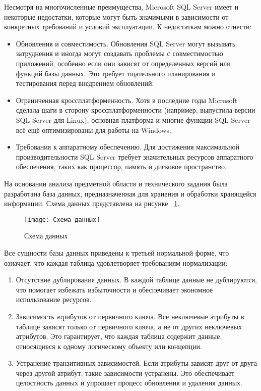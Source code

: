 Несмотря на многочисленные преимущества, Microsoft SQL Server имеет и некоторые недостатки, которые могут быть значимыми в зависимости от конкретных требований и условий эксплуатации. К недостаткам можно отнести:
\begin{itemize}
	\item Обновления и совместимость. Обновления SQL Server могут вызывать затруднения и иногда могут создавать проблемы с совместимостью приложений, особенно если они зависят от определенных версий или функций базы данных. Это требует тщательного планирования и тестирования перед внедрением обновлений.
	\item Ограниченная кроссплатформенность. Хотя в последние годы Microsoft сделала шаги в сторону кроссплатформенности (например, выпустила версии SQL Server для Linux), основная платформа и многие функции SQL Server всё ещё оптимизированы для работы на Windows. 
	\item Требования к аппаратному обеспечению. Для достижения максимальной производительности SQL Server требует значительных ресурсов аппаратного обеспечения, таких как процессор, память и дисковое пространство.
\end{itemize}

На основании анализа предметной области и технического задания была разработана база данных, предназначенная для хранения и обработки хранящейся информации. Схема данных представлена на рисунке ~\ref{templ:image1}.
\begin{figure}[H]
	\texttt{[image: Схема данных]}
	\caption{Схема данных}
	\label{templ:image1}
\end{figure}

Все сущности базы данных приведены к третьей нормальной форме, что означает, что каждая таблица удовлетворяет требованиям нормализации:
\begin{enumerate}
	\item Отсутствие дублирования данных. В каждой таблице данные не дублируются, что помогает избежать избыточности и обеспечивает экономное использование ресурсов.
	\item Зависимость атрибутов от первичного ключа. Все неключевые атрибуты в таблице зависят только от первичного ключа, а не от других неключевых атрибутов. Это гарантирует, что каждая таблица содержит данные, относящиеся к одному логическому объекту или концепции.
	\item Устранение транзитивных зависимостей. Если атрибуты зависят друг от друга через другой атрибут, такие зависимости устранены. Это обеспечивает целостность данных и упрощает процесс обновления и удаления данных.
\end{enumerate}

